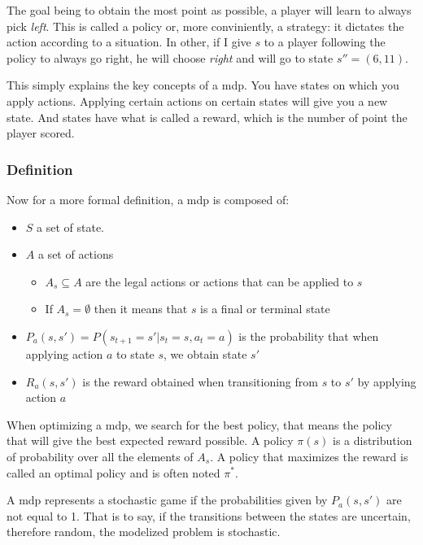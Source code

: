 The goal being to obtain the most point as possible, a player will learn to always pick \textit{left}.
This is called a policy or, more conviniently, a strategy: it dictates the action according to a situation.
In other, if I give \(s\) to a player following the policy to always go right, he will choose \textit{right} and will go to state \(s''=(6, 11)\).

This simply explains the key concepts of a \gls{mdp}.
You have states on which you apply actions.
Applying certain actions on certain states will give you a new state.
And states have what is called a reward, which is the number of point the player scored.

\subsubsection{Definition}%
\label{ssub:definition}

Now for a more formal definition, a \gls{mdp} is composed of:

\begin{itemize}
    \item \(S\) a set of state.
    \item \(A\) a set of actions
        \begin{itemize}
            \item \(A_{s} \subseteq A\) are the legal actions or actions that can be applied to \(s\)
            \item If \(A_{s} = \emptyset\) then it means that \(s\) is a final or terminal state
        \end{itemize}
    \item \(P_{a}(s, s') = P(s_{t+1} = s' | s_{t} = s, a_{t} = a)\) is the probability that when applying action \(a\) to state \(s\), we obtain state \(s'\)
    \item \(R_{a}(s, s')\) is the reward obtained when transitioning from \(s\) to \(s'\) by applying action \(a\)
\end{itemize}

When optimizing a \gls{mdp}, we search for the best policy, that means the policy that will give the best expected reward possible.
A policy \(\pi(s)\) is a distribution of probability over all the elements of \(A_s\).
A policy that maximizes the reward is called an optimal policy and is often noted \(\pi^{*}\).

A \gls{mdp} represents a stochastic game if the probabilities given by \(P_{a}(s, s')\) are not equal to 1.
That is to say, if the transitions between the states are uncertain, therefore random, the modelized problem is stochastic.

